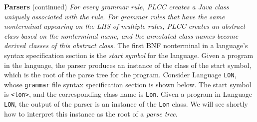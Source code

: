 \begin{minipage}[t]{\sw}
\slidenumber
\LARGE
{\bf Parsers} (continued)\exx
{\em
For every grammar rule,
PLCC creates a Java class uniquely associated with the rule.
For grammar rules that have the same nonterminal appearing
on the LHS of multiple rules,
PLCC creates an abstract class based on the nonterminal name,
and the annotated class names
become derived classes of this abstract class.}\exx
The first BNF nonterminal
in a language's syntax specification section
is the {\em start symbol} for the language.
Given a program in the language,
the parser produces an instance of the class of the start symbol,
which is the root of the parse tree for the program.\exx
Consider Language \verb'LON',
whose \verb'grammar' file syntax specification section is shown below.
The start symbol is \verb'<lon>',
and the corresponding class name is \verb'Lon'.
Given a program in Language \verb'LON',
the output of the parser is an instance of the \verb'Lon' class.
We will see shortly how to interpret this instance
as the root of a {\em parse tree}.\exx
\emm\LightBox{\MYlonGrammarOnly}
\end{minipage}
\clearpage
